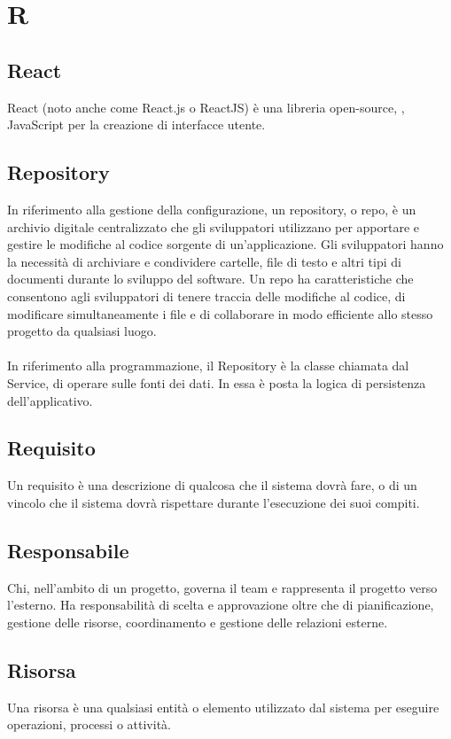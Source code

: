 \chapter{R}

\section{React}
React (noto anche come React.js o ReactJS) è una libreria open-source, , JavaScript per la creazione di interfacce utente.

\section{Repository}\label{sec:Repo}
In riferimento alla gestione della configurazione, un repository, o repo, è un archivio digitale centralizzato che gli sviluppatori utilizzano per apportare e gestire le modifiche al codice sorgente di un'applicazione. Gli sviluppatori hanno la necessità di archiviare e condividere cartelle, file di testo e altri tipi di documenti durante lo sviluppo del software. Un repo ha caratteristiche che consentono agli sviluppatori di tenere traccia delle modifiche al codice, di modificare simultaneamente i file e di collaborare in modo efficiente allo stesso progetto da qualsiasi luogo.\\ \\
In riferimento alla programmazione, il Repository è la classe chiamata dal Service,  di operare sulle fonti dei dati. In essa è posta la logica di persistenza dell'applicativo.

\section{Requisito}\label{sec:Requisiti}
Un requisito è una descrizione di qualcosa che il sistema dovrà fare, o di un vincolo che il sistema dovrà rispettare durante l’esecuzione dei suoi compiti.

\section{Responsabile}
Chi, nell'ambito di un progetto, governa il team e rappresenta il progetto verso l'esterno. Ha responsabilità di scelta e approvazione oltre che di pianificazione, gestione delle risorse, coordinamento e gestione delle relazioni esterne. 

\section{Risorsa}\label{sec:Risorse}
Una risorsa è una qualsiasi entità o elemento utilizzato dal sistema per eseguire operazioni, processi o attività.

